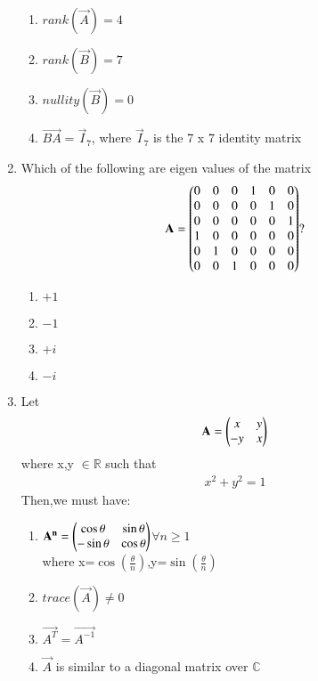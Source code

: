\begin{enumerate}[label=\thesection.\arabic*.,ref=\thesection.\theenumi]
\begin{enumerate} %
\item $rank(\vec{A}) = 4 $
\item $rank(\vec{B}) = 7 $
\item $nullity(\vec{B}) = 0 $
\item $\vec{BA} = \vec{I}_7 $, where $\vec{I}_7$ is the 7 x 7 identity matrix
\end{enumerate}
%
%
\solution

\item Which of the following are eigen values of the matrix
\begin{align}
    \mathbf A
=\begin{pmatrix}0 &0 &0 &1 &0 &0\\0 &0 &0 &0 & 1 &0
\\ 0& 0&0 &0 &0 &1\\1& 0 &0 &0 &0 &0\\ 0& 1 &0 &0 &0 &0\\0 &0 &1 &0 &0 &0\end{pmatrix}?
\label{eq:solutions/2014/dec/86/eq:matrix}  
\end{align}
\begin{enumerate}
    \item $+1$
    \item $-1$
    \item $+i$
    \item $-i$ 
\end{enumerate}
%
\solution

\item Let
\begin{align}
    \mathbf{A}=\begin{pmatrix}x&y\\-y&x\end{pmatrix}\label{eq:solutions/2014/dec/90/1}
\end{align}
where x,y $\in \mathbb{R}$ such that
\begin{align}
    x^{2}+y^{2}=1
\end{align}
Then,we must have:
\begin{enumerate}
\item{$\mathbf{A^{n}}=\begin{pmatrix}\cos\theta& \sin\theta\\-\sin\theta& \cos\theta\end{pmatrix}$$\forall n\geq{1}$\\ where x=$\cos(\frac{\theta}{n})$,y=$\sin(\frac{\theta}{n})$}
\item{$trace(\vec{A})\neq 0$}
\item{$\vec{A^{T}}=\vec{A^{-1}}$}
\item{$\vec{A}$ is similar to a diagonal matrix over $\mathbb{C}$}
\end{enumerate}
%
%
\solution


\end{enumerate}
